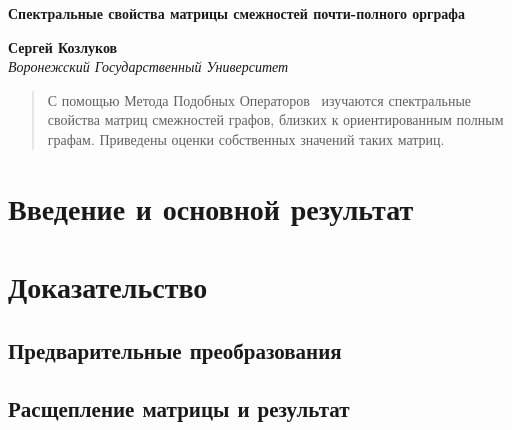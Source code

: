 \documentclass[11pt,a4paper,twoside]{article}
\theoremstyle{definition}
\begin{document}

\begin{center}
    \textbf{Спектральные свойства матрицы смежностей почти-полного орграфа}
    
    \textbf{Сергей Козлуков}\\[2mm]
    \emph{Воронежский Государственный Университет}
\end{center}

\begin{abstract}
    С помощью Метода Подобных Операторов~\cite{baskakov-harmonic,baskakov1983}
    изучаются спектральные свойства
    матриц смежностей графов, близких к ориентированным полным графам.
    Приведены оценки собственных значений таких матриц.
\end{abstract}

\section{Введение и основной результат}

\section{Доказательство}
\subsection*{Предварительные преобразования}

\subsection*{Расщепление матрицы и результат}



\printbibliography
\end{document}
